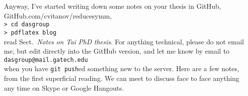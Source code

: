 Anyway, I've started writing down some notes on your thesis in GitHub,
\\
{GitHub.com/cvitanov/reducesymm},
\\
\texttt{> cd dasgroup} \\
\texttt{> pdflatex blog} \\
read Sect.~{\em Notes on Tai PhD thesis}. For anything technical, please do
not email me, but edit directly into the GitHub version, and let me know
by email to \\
\texttt{dasgroup@mail.gatech.edu}\\
 when you have \texttt{git
push}ed something new to the server. Here are a few notes, from the first
superficial reading. We can meet to discuss face to face anything any
time on Skype or Google Hangouts.

